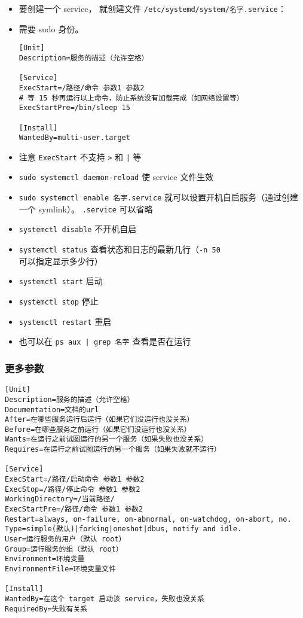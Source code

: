 
\begin{itemize}
\item 要创建一个 service， 就创建文件 \verb|/etc/systemd/system/名字.service|：
\item 需要 sudo 身份。
\begin{lstlisting}[language=none,caption=名字.service]
[Unit]
Description=服务的描述（允许空格）

[Service]
ExecStart=/路径/命令 参数1 参数2
# 等 15 秒再运行以上命令，防止系统没有加载完成（如网络设置等）
ExecStartPre=/bin/sleep 15

[Install]
WantedBy=multi-user.target
\end{lstlisting}
\item 注意 \verb|ExecStart| 不支持 \verb|>| 和 \verb`|` 等
\item \verb|sudo systemctl daemon-reload| 使 service 文件生效
\item \verb|sudo systemctl enable 名字.service| 就可以设置开机自启服务（通过创建一个 symlink）。 \verb`.service` 可以省略
\item \verb|systemctl disable| 不开机自启
\item \verb|systemctl status| 查看状态和日志的最新几行（\verb`-n 50` 可以指定显示多少行）
\item \verb|systemctl start| 启动
\item \verb|systemctl stop| 停止
\item \verb|systemctl restart| 重启
\item 也可以在 \verb`ps aux | grep 名字` 查看是否在运行
\end{itemize}

\subsubsection{更多参数}
\begin{lstlisting}[language=none,caption=名字.service]
[Unit]
Description=服务的描述（允许空格）
Documentation=文档的url
After=在哪些服务运行后运行（如果它们没运行也没关系）
Before=在哪些服务之前运行（如果它们没运行也没关系）
Wants=在运行之前试图运行的另一个服务（如果失败也没关系）
Requires=在运行之前试图运行的另一个服务（如果失败就不运行）

[Service]
ExecStart=/路径/启动命令 参数1 参数2
ExecStop=/路径/停止命令 参数1 参数2
WorkingDirectory=/当前路径/
ExecStartPre=/路径/命令 参数1 参数2
Restart=always, on-failure, on-abnormal, on-watchdog, on-abort, no.
Type=simple(默认)|forking|oneshot|dbus, notify and idle.
User=运行服务的用户（默认 root）
Group=运行服务的组（默认 root）
Environment=环境变量
EnvironmentFile=环境变量文件

[Install]
WantedBy=在这个 target 启动该 service，失败也没关系
RequiredBy=失败有关系
\end{lstlisting}

